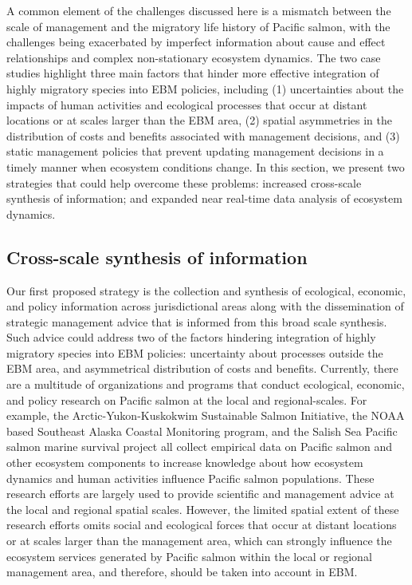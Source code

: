 A common element of the challenges discussed here is a mismatch between the
scale of management and the migratory life history of Pacific salmon, with the
challenges being exacerbated by imperfect information about cause and effect
relationships and complex non-stationary ecosystem dynamics. The two case
studies highlight three main factors that hinder more effective integration of
highly migratory species into EBM policies, including (1) uncertainties about
the impacts of human activities and ecological processes that occur at distant
locations or at scales larger than the EBM area, (2) spatial asymmetries in the
distribution of costs and benefits associated with management decisions, and (3)
static management policies that prevent updating management decisions in a
timely manner when ecosystem conditions change. In this section, we present two
strategies that could help overcome these problems: increased cross-scale
synthesis of information; and expanded near real-time data analysis of ecosystem
dynamics.


\subsection{Cross-scale synthesis of information}

Our first proposed strategy is the collection and synthesis of ecological,
economic, and policy information across jurisdictional areas along with the
dissemination of strategic management advice that is informed from this broad
scale synthesis. Such advice could address two of the factors hindering
integration of highly migratory species into EBM policies: uncertainty about
processes outside the EBM area, and asymmetrical distribution of costs and
benefits. Currently, there are a multitude of organizations and programs that
conduct ecological, economic, and policy research on Pacific salmon at the local
and regional-scales. For example, the Arctic-Yukon-Kuskokwim Sustainable Salmon
Initiative, the NOAA based Southeast Alaska Coastal Monitoring program, and the
Salish Sea Pacific salmon marine survival project all collect empirical data on
Pacific salmon and other ecosystem components to increase knowledge about how
ecosystem dynamics and human activities influence Pacific salmon populations.
These research efforts are largely used to provide scientific and management
advice at the local and regional spatial scales. However, the limited spatial
extent of these research efforts omits social and ecological forces that occur
at distant locations or at scales larger than the management area, which can
strongly influence the ecosystem services generated by Pacific salmon within the
local or regional management area, and therefore, should be taken into account
in EBM.

